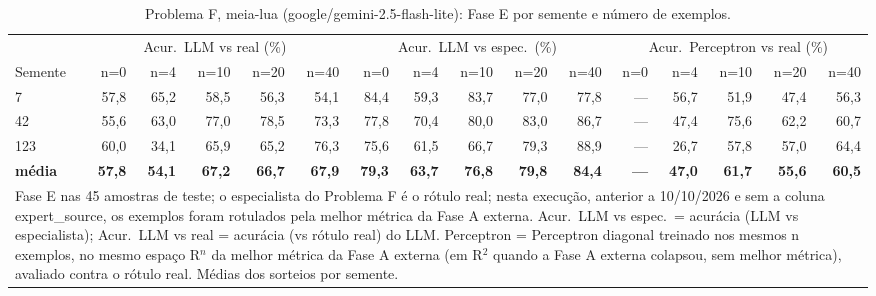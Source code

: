 \begin{table}[htbp]
\centering
\footnotesize
\caption{Problema F, meia-lua (google/gemini-2.5-flash-lite): Fase E por semente e número de exemplos.}
\label{tab:bloco2_F_meialua_faseE_nshot_flashlite}
\begin{tabular}{lrrrrrrrrrrrrrrr}
\toprule
 & \multicolumn{5}{c}{Acur.\ LLM vs real (\%)} & \multicolumn{5}{c}{Acur.\ LLM vs espec.\ (\%)} & \multicolumn{5}{c}{Acur.\ Perceptron vs real (\%)} \\ \cmidrule(lr){2-6} \cmidrule(lr){7-11} \cmidrule(lr){12-16}
Semente & n=0 & n=4 & n=10 & n=20 & n=40 & n=0 & n=4 & n=10 & n=20 & n=40 & n=0 & n=4 & n=10 & n=20 & n=40 \\
\midrule
7 & 57,8 & 65,2 & 58,5 & 56,3 & 54,1 & 84,4 & 59,3 & 83,7 & 77,0 & 77,8 & — & 56,7 & 51,9 & 47,4 & 56,3 \\
42 & 55,6 & 63,0 & 77,0 & 78,5 & 73,3 & 77,8 & 70,4 & 80,0 & 83,0 & 86,7 & — & 47,4 & 75,6 & 62,2 & 60,7 \\
123 & 60,0 & 34,1 & 65,9 & 65,2 & 76,3 & 75,6 & 61,5 & 66,7 & 79,3 & 88,9 & — & 26,7 & 57,8 & 57,0 & 64,4 \\
\midrule
\textbf{média} & \textbf{57,8} & \textbf{54,1} & \textbf{67,2} & \textbf{66,7} & \textbf{67,9} & \textbf{79,3} & \textbf{63,7} & \textbf{76,8} & \textbf{79,8} & \textbf{84,4} & \textbf{—} & \textbf{47,0} & \textbf{61,7} & \textbf{55,6} & \textbf{60,5} \\
\bottomrule
\multicolumn{16}{p{0.95\linewidth}}{\footnotesize Fase E nas 45 amostras de teste; o especialista do Problema F é o rótulo real; nesta execução, anterior a 10/10/2026 e sem a coluna expert\_source, os exemplos foram rotulados pela melhor métrica da Fase A externa. Acur.\ LLM vs espec.\ = acurácia (LLM vs especialista); Acur.\ LLM vs real = acurácia (vs rótulo real) do LLM. Perceptron = Perceptron diagonal treinado nos mesmos n exemplos, no mesmo espaço R$^n$ da melhor métrica da Fase A externa (em R$^2$ quando a Fase A externa colapsou, sem melhor métrica), avaliado contra o rótulo real. Médias dos sorteios por semente.} \\
\end{tabular}
\end{table}
